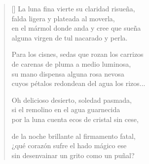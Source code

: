 



\settowidth{\versewidth}{Por la luna cuenta sin fin sus ecos de cristal,}

\bigskip

\begin{verse}[\versewidth]
  La luna fina vierte su claridad risueña, \\
  falda ligera y plateada al moverla, \\
  en el mármol donde anda y cree que sueña \\
  alguna virgen de tul nacarado y perla.

  Para los cisnes, sedas que rozan los carrizos \\
  de carenas de pluma a medio luminosa, \\
  su mano dispensa alguna rosa nevosa \\
  cuyos pétalos redondean del agua los rizos...

  Oh delicioso desierto, soledad pasmada, \\
  si el remolino en el agua guarnecida \\
  por la luna cuenta ecos de cristal sin cese,

  de la noche brillante al firmamento fatal, \\
  ¿qué corazón sufre el hado mágico ese \\
  sin desenvainar un grito como un puñal?
\end{verse}

\newpage



\bigskip

\settowidth{\versewidth}{Sur les masses de marbre où marche et croit songer}

